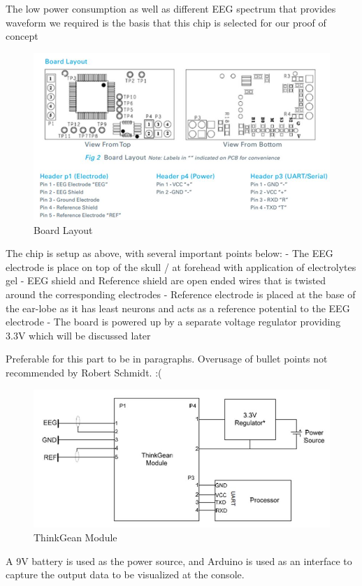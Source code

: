 The low power consumption as well as different EEG spectrum that provides waveform we required is the basis that this chip is selected for our proof of concept

\begin{figure}[H]
	\centering
	\includegraphics[width=0.8\linewidth]{jiahuipic3.jpg}
	\caption{Board Layout}
\end{figure}

The chip is setup as above, with several important points below:
-	The EEG electrode is place on top of the skull / at forehead with application of electrolytes gel
-	EEG shield and Reference shield are open ended wires that is twisted around the corresponding electrodes
-	Reference electrode is placed at the base of the ear-lobe as it has least neurons and acts as a reference potential to the EEG electrode
-	The board is powered up by a separate voltage regulator providing 3.3V which will be discussed later

Preferable for this part to be in paragraphs. Overusage of bullet points not recommended by Robert Schmidt. :( 

\begin{figure}[H]
	\centering
	\includegraphics[width=0.7\linewidth]{jiahuipic4.jpg}
	\caption{ThinkGean Module}
\end{figure}

A 9V battery is used as the power source, and Arduino is used as an interface to capture the output data to be visualized at the console. 

